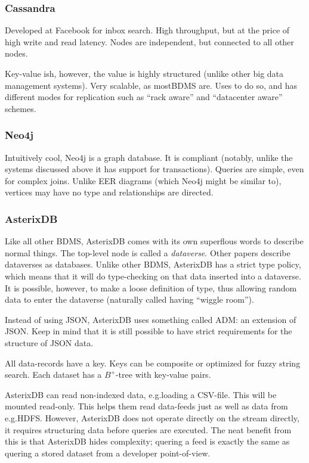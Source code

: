 \subsubsection{Cassandra}\label{sec:cassandra}
Developed at Facebook for inbox search.
High throughput, but at the price of high write and read latency.
Nodes are independent, but connected to all other nodes.

Key-value ish, however, the value is highly structured (unlike other big data
management systems).  Very scalable, as mostBDMS are.
Uses  to do so, and has different modes for replication
such as ``rack aware'' and ``datacenter aware'' schemes.

\subsubsection{Neo4j}\label{sec:neo4j}
Intuitively cool, Neo4j is a graph database. It is  compliant (notably, unlike the systems discussed above it has support for transactions).
Queries are simple, even for complex joins. Unlike EER diagrams (which Neo4j might be
similar to), vertices may have no type and relationships are directed.

\subsubsection{AsterixDB}\label{sec:asterixdb}
Like all other BDMS, AsterixDB comes with its own superflous words to describe
normal things. The top-level node is called a \textit{dataverse}. Other papers describe
dataverses as databases. Unlike other BDMS, AsterixDB has a strict type policy,
which means that it will do type-checking on that data inserted into a dataverse.
It is possible, however, to make a loose definition of type, thus allowing random data
to enter the dataverse (naturally called having ``wiggle room'').

Instead of using JSON, AsterixDB uses something called ADM: an
extension of JSON. Keep in mind that it is still possible to have strict
requirements for the structure of JSON data. 

All data-records have a key. Keys can be composite or optimized for fuzzy string search.
Each dataset has a $B^{+}$-tree with key-value pairs.

AsterixDB can read non-indexed data, e.g.\@ loading a CSV-file. This will be mounted read-only.
This helps them read data-feeds just as well as data from e.g.\@ HDFS. However, AsterixDB does not operate
directly on the stream directly, it requires structuring data before queries are executed.
The neat benefit from this is that AsterixDB hides complexity; quering a feed is exactly
the same as quering a stored dataset from a developer point-of-view.

